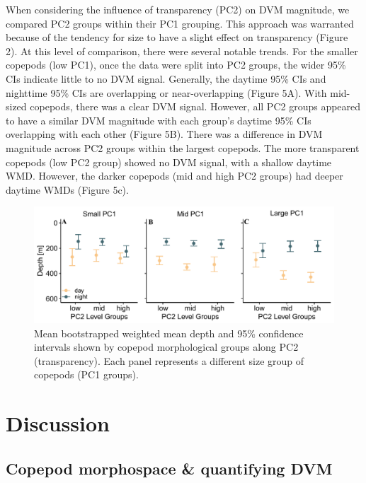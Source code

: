 \documentclass[
]{article}
\begin{document}
When considering the influence of transparency (PC2) on DVM magnitude,
we compared PC2 groups within their PC1 grouping. This approach was
warranted because of the tendency for size to have a slight effect on
transparency (Figure 2). At this level of comparison, there were several
notable trends. For the smaller copepods (low PC1), once the data were
split into PC2 groups, the wider 95\% CIs indicate little to no DVM
signal. Generally, the daytime 95\% CIs and nighttime 95\% CIs are
overlapping or near-overlapping (Figure 5A). With mid-sized copepods,
there was a clear DVM signal. However, all PC2 groups appeared to have a
similar DVM magnitude with each group's daytime 95\% CIs overlapping
with each other (Figure 5B). There was a difference in DVM magnitude
across PC2 groups within the largest copepods. The more transparent
copepods (low PC2 group) showed no DVM signal, with a shallow daytime
WMD. However, the darker copepods (mid and high PC2 groups) had deeper
daytime WMDs (Figure 5c).

\begin{figure}

{\centering \includegraphics{../media/figure_05.pdf}

}

\caption{Mean bootstrapped weighted mean depth and 95\% confidence
intervals shown by copepod morphological groups along PC2
(transparency). Each panel represents a different size group of copepods
(PC1 groups).}

\end{figure}

\hypertarget{discussion}{%
\section{Discussion}\label{discussion}}

\hypertarget{copepod-morphospace-quantifying-dvm}{%
\subsection{Copepod morphospace \& quantifying
DVM}\label{copepod-morphospace-quantifying-dvm}}
\end{document}
